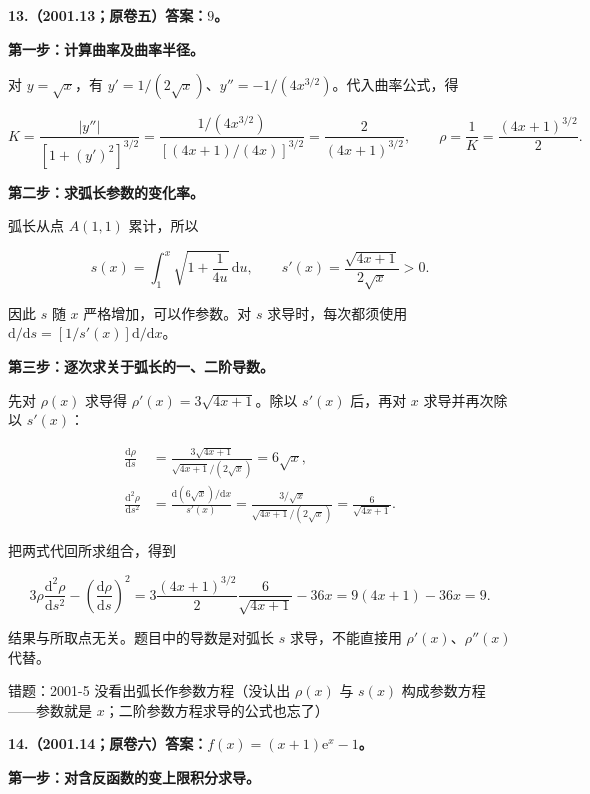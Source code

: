 \documentclass[UTF8,11pt,fontset=windows]{ctexart}
\begin{document}
\clearpage

\textbf{13.（2001.13；原卷五）答案：$9$。}

\textbf{第一步：计算曲率及曲率半径。}

对 $y=\sqrt x$，有 $y'=1/(2\sqrt x)$、$y''=-1/(4x^{3/2})$。代入曲率公式，得

$$
K=\frac{|y''|}{[1+(y')^2]^{3/2}}
=\frac{1/(4x^{3/2})}{[(4x+1)/(4x)]^{3/2}}
=\frac2{(4x+1)^{3/2}},
\qquad \rho=\frac1K=\frac{(4x+1)^{3/2}}2.
$$

\textbf{第二步：求弧长参数的变化率。}

弧长从点 $A(1,1)$ 累计，所以

$$
s(x)=\int_1^x\sqrt{1+\frac1{4u}}\,\mathrm du,
\qquad s'(x)=\frac{\sqrt{4x+1}}{2\sqrt x}>0.
$$

因此 $s$ 随 $x$ 严格增加，可以作参数。对 $s$ 求导时，每次都须使用 $\mathrm d/\mathrm ds=[1/s'(x)]\mathrm d/\mathrm dx$。

\textbf{第三步：逐次求关于弧长的一、二阶导数。}

先对 $\rho(x)$ 求导得 $\rho'(x)=3\sqrt{4x+1}$。除以 $s'(x)$ 后，再对 $x$ 求导并再次除以 $s'(x)$：

$$
\begin{aligned}
\frac{\mathrm d\rho}{\mathrm ds}
&=\frac{3\sqrt{4x+1}}{\sqrt{4x+1}/(2\sqrt x)}=6\sqrt x,\\
\frac{\mathrm d^2\rho}{\mathrm ds^2}
&=\frac{\mathrm d(6\sqrt x)/\mathrm dx}{s'(x)}
=\frac{3/\sqrt x}{\sqrt{4x+1}/(2\sqrt x)}
=\frac6{\sqrt{4x+1}}.
\end{aligned}
$$

把两式代回所求组合，得到

$$
3\rho\frac{\mathrm d^2\rho}{\mathrm ds^2}
-\left(\frac{\mathrm d\rho}{\mathrm ds}\right)^2
=3\frac{(4x+1)^{3/2}}2\frac6{\sqrt{4x+1}}-36x
=9(4x+1)-36x=\boxed9.
$$

结果与所取点无关。题目中的导数是对弧长 $s$ 求导，不能直接用 $\rho'(x)$、$\rho''(x)$ 代替。

\begingroup\color{gray}错题：2001-5 没看出弧长作参数方程（没认出 $\rho(x)$ 与 $s(x)$ 构成参数方程——参数就是 $x$；二阶参数方程求导的公式也忘了）\par\endgroup

\clearpage

\textbf{14.（2001.14；原卷六）答案：$f(x)=(x+1)\mathrm e^x-1$。}

\textbf{第一步：对含反函数的变上限积分求导。}
\end{document}
